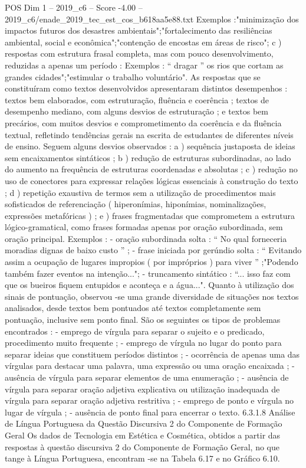 \begin{textsample}{POS Dim 1 – 2019\_c6 – Score -4.00 – 2019\_c6/enade\_2019\_tec\_est\_cos\_b618aa5e88.txt}
Exemplos :"minimização dos impactos futuros dos desastres ambientais";"fortalecimento das resiliências ambiental, social e econômica";"contenção de encostas em áreas de risco"; c ) respostas com estrutura frasal completa, mas com pouco desenvolvimento, reduzidas a apenas um período : Exemplos : “ dragar ” os rios que cortam as grandes cidades";"estimular o trabalho voluntário".
As respostas que se constituíram como textos desenvolvidos apresentaram distintos desempenhos : textos bem elaborados, com estruturação, fluência e coerência ; textos de desempenho mediano, com alguns desvios de estruturação ; e textos bem precários, com muitos desvios e comprometimento da coerência e da fluência textual, refletindo tendências gerais na escrita de estudantes de diferentes níveis de ensino.
Seguem alguns desvios observados : a ) sequência justaposta de ideias sem encaixamentos sintáticos ; b ) redução de estruturas subordinadas, ao lado do aumento na frequência de estruturas coordenadas e absolutas ; c ) redução no uso de conectores para expressar relações lógicas essenciais à construção do texto ; d ) repetição exaustiva de termos sem a utilização de procedimentos mais sofisticados de referenciação ( hiperonímias, hiponímias, nominalizações, expressões metafóricas ) ; e ) frases fragmentadas que comprometem a estrutura lógico-gramatical, como frases formadas apenas por oração subordinada, sem oração principal.
Exemplos : - oração subordinada solta : “ No qual forneceria moradias dignas de baixo custo ” ; - frase iniciada por gerúndio solta : “ Evitando assim a ocupação de lugares impropios ( por impróprios ) para viver ” ;"Podendo também fazer eventos na intenção..."; - truncamento sintático : “... isso faz com que os bueiros fiquem entupidos e aconteça e a água...".
Quanto à utilização dos sinais de pontuação, observou -se uma grande diversidade de situações nos textos analisados, desde textos bem pontuados até textos completamente sem pontuação, inclusive sem ponto final.
São os seguintes os tipos de problemas encontrados : - emprego de vírgula para separar o sujeito e o predicado, procedimento muito frequente ; - emprego de vírgula no lugar do ponto para separar ideias que constituem períodos distintos ; - ocorrência de apenas uma das vírgulas para destacar uma palavra, uma expressão ou uma oração encaixada ; - ausência de vírgula para separar elementos de uma enumeração ; - ausência de vírgula para separar oração adjetiva explicativa ou utilização inadequada de vírgula para separar oração adjetiva restritiva ; - emprego de ponto e vírgula no lugar de vírgula ; - ausência de ponto final para encerrar o texto. 6.3.1.8 Análise de Língua Portuguesa da Questão Discursiva 2 do Componente de Formação Geral Os dados de Tecnologia em Estética e Cosmética, obtidos a partir das respostas à questão discursiva 2 do Componente de Formação Geral, no que tange à Língua Portuguesa, encontram -se na Tabela 6.17 e no Gráfico 6.10.

\end{textsample}
